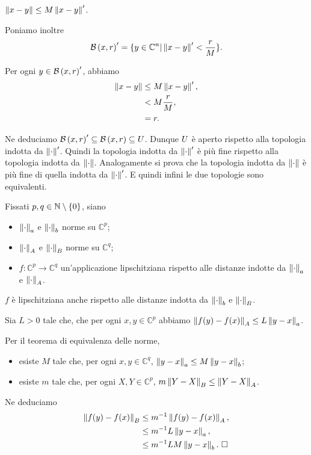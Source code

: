 $\Norm{x - y} \leq M\Norm{x - y}'$.
\par Poniamo inoltre
\[
  \OpenBall{x}{r}' = \lbrace y \in \mathbb{C}^n |
    \Norm{x - y}' < \frac{r}{M} \rbrace.
\]
\par Per ogni $y \in \mathcal{B}\left (x,r \right)'$, abbiamo
\begin{align*}
  \Norm{x - y}
  &\leq M\Norm{x - y}',\\
  &< M \frac{r}{M},\\
  &= r.
\end{align*}
\par Ne deduciamo
$\mathcal{B}\left (x,r \right)' \subseteq \mathcal{B}\left (x,r \right) \subseteq U$.
Dunque $U$ \`e aperto rispetto alla topologia indotta da $\Norm{\cdot}'$.
Quindi la topologia indotta da $\Norm{\cdot}'$ \`e pi\`u fine rispetto alla
topologia indotta da $\Norm{\cdot}$. Analogamente si prova che la topologia
indotta da $\Norm{\cdot}$ \`e pi\`u fine di quella indotta da $\Norm{\cdot}'$.
E quindi infini le due topologie sono equivalenti. \EndProof
\begin{Corollary}
  Fissati $p, q \in \mathbb{N} \setminus \lbrace 0 \rbrace$, siano
  \begin{itemize}
    \item $\Norm{\cdot}[a]$ e $\Norm{\cdot}[b]$ norme su $\mathbb{C}^p$;
    \item $\Norm{\cdot}[A]$ e $\Norm{\cdot}[B]$ norme su $\mathbb{C}^q$;
    \item $f: \mathbb{C}^p \rightarrow \mathbb{C}^q$ un'applicazione
      lipschitziana rispetto alle distanze indotte da $\Norm{\cdot}[a]$ e
      $\Norm{\cdot}[A]$.
  \end{itemize}
  $f$ \`e lipschitziana anche rispetto alle distanze indotta da
  $\Norm{\cdot}[b]$ e $\Norm{\cdot}[B]$.
\end{Corollary}
\Proof Sia $L > 0$ tale che, che per ogni $x, y \in \mathbb{C}^p$ abbiamo
$\Norm{f(y) - f(x)}[A] \leq L \Norm{y - x}[a]$.
\par Per il teorema di equivalenza delle norme,
\begin{itemize}
  \item esiste $M$ tale che, per ogni
    $x, y \in \mathbb{C}^q$, $\Norm{y - x}[a] \leq M \Norm{y - x}[b]$;
  \item esiste $m$ tale che, per ogni
    $X, Y \in \mathbb{C}^p$, $m \Norm{Y - X}[B] \leq \Norm{Y - X}[A]$.
\end{itemize}
\par Ne deduciamo
\begin{align*}
  \Norm{f(y) - f(x)}[B]
  &\leq m^{-1} \Norm{f(y) - f(x)}[A],\\
  &\leq m^{-1} L \Norm{y - x}[a],\\
  &\leq m^{-1} L M \Norm{y - x}[b]. \text{ \EndProof}
\end{align*}
